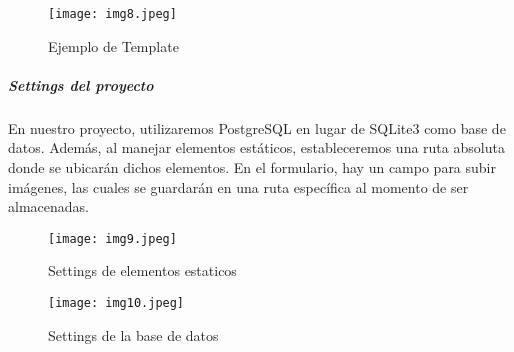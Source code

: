 \documentclass[10pt, a4paper]{article}
\begin{document}
		\begin{figure}[h]
			\centering
			\texttt{[image: img8.jpeg]}
			\caption{Ejemplo de Template}
		\end{figure}
	\subparagraph*{Settings del proyecto}
		\begin{flushleft}
			En nuestro proyecto, utilizaremos PostgreSQL en lugar de SQLite3 como base de datos. Además, al manejar elementos estáticos, estableceremos una ruta absoluta donde se ubicarán dichos elementos. En el formulario, hay un campo para subir imágenes, las cuales se guardarán en una ruta específica al momento de ser almacenadas.
		\end{flushleft}
		\begin{figure}[h]
			\centering
			\texttt{[image: img9.jpeg]}
			\caption{Settings de elementos estaticos}
		\end{figure}
		\begin{figure}[h]
			\centering
			\texttt{[image: img10.jpeg]}
			\caption{Settings de la base de datos}
		\end{figure}
\end{document}
